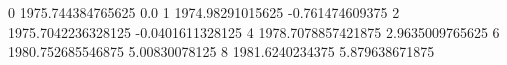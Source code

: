 0 1975.744384765625 0.0
1 1974.98291015625 -0.761474609375
2 1975.7042236328125 -0.0401611328125
4 1978.7078857421875 2.9635009765625
6 1980.752685546875 5.00830078125
8 1981.6240234375 5.879638671875
